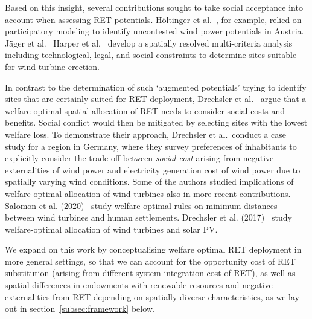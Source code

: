 \documentclass[review, 3p, times]{elsarticle} %
\begin{document}
    Based on this insight, several contributions sought to take social acceptance into account when assessing RET
    potentials.
    Höltinger et al.\ \cite{Hoeltinger2016}, for example, relied on participatory modeling to identify uncontested wind
    power potentials in Austria.
    Jäger et al.\ \cite{Jaeger2016} 
    Harper et al.\ \cite{Harper2019} develop a spatially resolved multi-criteria analysis including technological, legal,
    and social constraints to determine sites suitable for wind turbine erection.

    In contrast to the determination of such `augmented potentials' trying to identify sites that are certainly suited
    for RET deployment, Drechsler et al.\ \cite{Drechsler2011} argue that a welfare-optimal spatial allocation of RET
    needs to consider social costs and benefits.
    Social conflict would then be mitigated by selecting sites with the lowest welfare loss.
    To demonstrate their approach, Drechsler et al.\ conduct a case study for a region in Germany, where they survey
    preferences of inhabitants to explicitly consider the trade-off between \emph{social cost} arising from negative
    externalities of wind power and electricity generation cost of wind power due to spatially varying wind conditions.
    Some of the authors studied implications of welfare optimal allocation of wind turbines also in more recent
    contributions.
    Salomon et al. (2020)~\citep{Salomon2020} study welfare-optimal rules on minimum distances between wind turbines and
    human settlements.
    Drechsler et al. (2017)~\citep{Drechsler2017} study welfare-optimal allocation of wind turbines and solar PV.

    We expand on this work by conceptualising welfare optimal RET deployment in more general settings, so that we can
    account for the opportunity cost of RET substitution (arising from different system integration cost of RET), as
    well as spatial differences in endowments with renewable resources and negative externalities from RET depending on
    spatially diverse characteristics, as we lay out in section~\ref{subsec:framework} below.
\end{document}
